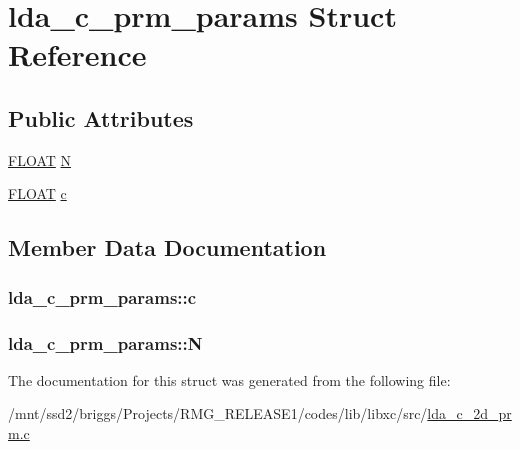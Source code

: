 \hypertarget{structlda__c__prm__params}{\section{lda\-\_\-c\-\_\-prm\-\_\-params Struct Reference}
\label{structlda__c__prm__params}
}
\subsection*{Public Attributes}
\begin{DoxyCompactItemize}
\item 
\hyperlink{src_2xc__config_8h_ae8690abbffa85934d64d545920e2b108}{F\-L\-O\-A\-T} \hyperlink{structlda__c__prm__params_a796b8dc143e5335f9598ecc481df5367}{N}
\item 
\hyperlink{src_2xc__config_8h_ae8690abbffa85934d64d545920e2b108}{F\-L\-O\-A\-T} \hyperlink{structlda__c__prm__params_a9adc346702bbfe6e47c5f5e431dbff2c}{c}
\end{DoxyCompactItemize}


\subsection{Member Data Documentation}
\hypertarget{structlda__c__prm__params_a9adc346702bbfe6e47c5f5e431dbff2c}{
\subsubsection[{c}]{ lda\-\_\-c\-\_\-prm\-\_\-params\-::c}}\label{structlda__c__prm__params_a9adc346702bbfe6e47c5f5e431dbff2c}
\hypertarget{structlda__c__prm__params_a796b8dc143e5335f9598ecc481df5367}{
\subsubsection[{N}]{ lda\-\_\-c\-\_\-prm\-\_\-params\-::\-N}}\label{structlda__c__prm__params_a796b8dc143e5335f9598ecc481df5367}


The documentation for this struct was generated from the following file\-:\begin{DoxyCompactItemize}
\item 
/mnt/ssd2/briggs/\-Projects/\-R\-M\-G\-\_\-\-R\-E\-L\-E\-A\-S\-E1/codes/lib/libxc/src/\hyperlink{lda__c__2d__prm_8c}{lda\-\_\-c\-\_\-2d\-\_\-prm.\-c}\end{DoxyCompactItemize}
